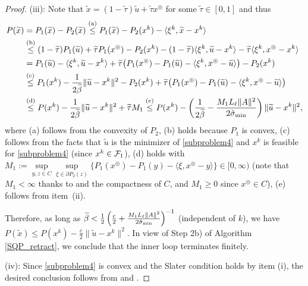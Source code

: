 \documentclass[10pt]{article}
\numberwithin{equation}{section}
\def\sigmamin{{\rm\tilde{\sigma}_{min}}}
\def\xfeasss{x^\circledcirc}
\begin{document}
\begin{proof}
(iii): Note that $\widetilde{x} = (1 - \widetilde{\tau})\widetilde{u} + \widetilde{\tau} \xfeasss$ for some $\widetilde{\tau}\in [0,1]$ and thus
\[
\begin{aligned}
P(\widetilde{x}) &= P_1(\widetilde{x}) - P_2(\widetilde{x}) \overset{\rm (a)}\leq P_1(\widetilde{x}) - P_2(x^k) - \langle \xi^k, \widetilde{x} - x^k\rangle \\
&\overset{\rm (b)}\leq (1 - \widetilde{\tau})P_1(\widetilde{u}) + \widetilde{\tau}P_1(\xfeasss) - P_2(x^k) - (1 - \widetilde{\tau})\langle \xi^k, \widetilde{u} - x^k\rangle - \widetilde{\tau}\langle \xi^k, \xfeasss - x^k\rangle\\
&= P_1(\widetilde{u}) - \langle \xi^k, \widetilde{u} - x^k\rangle + \widetilde{\tau}\big(P_1(\xfeasss) - P_1(\widetilde{u}) - \langle \xi^k, \xfeasss - \widetilde{u}\rangle \big) - P_2(x^k)\\
&\overset{\rm (c)}\leq P_1(x^k) - \frac{1}{2\widetilde{\beta}}\|\widetilde{u} - x^k\|^2  - P_2(x^k) + \widetilde{\tau}\big(P_1(\xfeasss) - P_1(\widetilde{u}) - \langle \xi^k, \xfeasss - \widetilde{u}\rangle \big)\\
&\overset{\rm (d)}\leq P(x^k) - \frac{1}{2\widetilde{\beta}}\|\widetilde{u} - x^k\|^2 + \widetilde{\tau}M_1 \overset{\rm (e)}\leq P(x^k) - \left(\frac{1}{2\widetilde{\beta}} - \frac{M_1L_{\ell}\|A\|^2}{2\sigmamin}\right)\|\widetilde{u} - x^k\|^2,
\end{aligned}
\]
where (a) follows from the convexity of $P_2$, (b) holds because $P_1$ is convex, (c) follows from the facts that $\widetilde{u}$ is the minimizer of \eqref{subproblem4} and $x^k$ is feasible for \eqref{subproblem4} (since $x^k\in {\cal F}_1$), (d) holds with $M_1:= \sup\limits_{y,z\in C}\sup\limits_{\xi\in\partial P_2(z)}\{P_1(\xfeasss) - P_1(y) - \langle\xi, \xfeasss - y\rangle\}\in [0,\infty)$ (note that $M_1 < \infty$ thanks to \cite[Theorem~2.6]{Tu98} and the compactness of $C$, and $M_1\ge 0$ since $\xfeasss\in C$), (e) follows from item~(ii).

Therefore, as long as $\widetilde{\beta} < \frac{1}{2}\left(\frac{c}2 + \frac{M_1L_{\ell}\|A\|^2}{2\sigmamin}\right)^{-1}$ (independent of $k$), we have $P(\widetilde{x}) \leq P(x^k) - \frac{c}{2}\|\widetilde{u} - x^k\|^2$. In view of {Step 2b)} of Algorithm \ref{SQP_retract}, we conclude that the inner loop terminates finitely.

(iv): Since \eqref{subproblem4} is convex and the Slater condition holds by item (i), the desired conclusion follows from \cite[Corollary~28.2.1]{Ro70} and \cite[Theorem~28.3]{Ro70}.
\end{proof}
\end{document}
